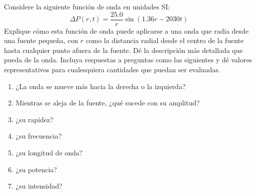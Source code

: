 \item Considere la siguiente función de onda en unidades SI:
$$ \Delta P(r, t) = \frac{25.0}{r} \sin(1.36r - 2030t) $$
Explique cómo esta función de onda puede aplicarse a una onda que radia desde una fuente pequeña, con $r$ como la distancia radial desde el centro de la fuente hasta cualquier punto afuera de la fuente. Dé la descripción más detallada que pueda de la onda. Incluya respuestas a preguntas como las siguientes y dé valores representativos para cualesquiera cantidades que puedan ser evaluadas.
\begin{enumerate}
    \item ¿La onda se mueve más hacia la derecha o la izquierda?
    \item Mientras se aleja de la fuente, ¿qué sucede con su amplitud?
    \item ¿su rapidez?
    \item ¿su frecuencia?
    \item ¿su longitud de onda?
    \item ¿su potencia?
    \item ¿su intensidad?
\end{enumerate}